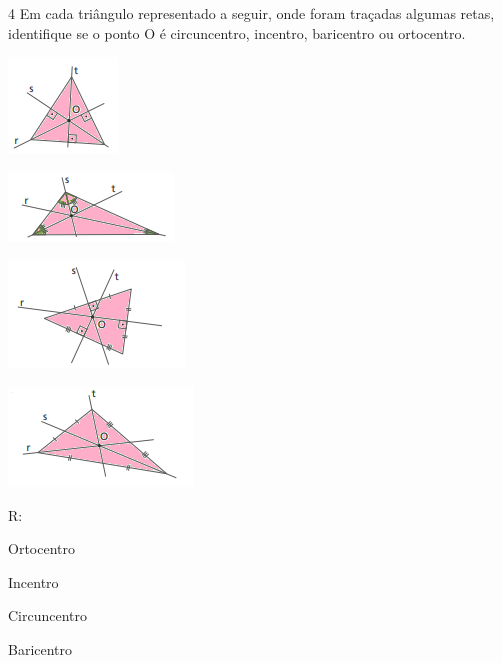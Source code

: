 {\num{4} Em cada triângulo representado a seguir, onde foram traçadas algumas
retas, identifique se o ponto O é circuncentro, incentro, baricentro ou
ortocentro.
\item
\includegraphics[width=1.14583in,height=1.01042in]{./imgSAEB_8_MAT/media/image15.png}
\item
\includegraphics[width=1.72917in,height=0.71875in]{./imgSAEB_8_MAT/media/image16.png}
\item
\includegraphics[width=1.84375in,height=1.125in]{./imgSAEB_8_MAT/media/image17.png}
\item
\includegraphics[width=1.9375in,height=1.04167in]{./imgSAEB_8_MAT/media/image18.png}

R:
\item Ortocentro
\item Incentro
\item Circuncentro
\item Baricentro

}
